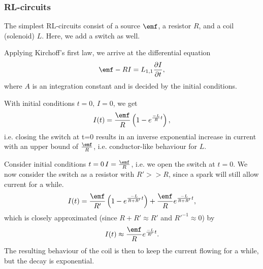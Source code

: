 \documentclass[a4paper, 12pt]{article}
\begin{document}
        \subsubsection{RL-circuits}
            The simplest RL-circuits consist of a source $\emf$, a resistor $R$, and a coil (solenoid) $L$.
            Here, we add a switch as well.

            Applying Kirchoff's first law, we arrive at the differential equation
            \begin{equation}
                \emf - RI = L_{1,1}\frac{\partial I}{\partial t},
            \end{equation}
            where $A$ is an integration constant and is decided by the initial conditions.

            With initial conditions $t=0,\, I=0$, we get 
            \begin{equation}
                I(t) = \frac{\emf}{R}\left(1-e^{\frac{-L}{R}t}\right),
            \end{equation}
            i.e. closing the switch at t=0 results in an inverse exponential increase in current 
            with an upper bound of $\frac{\emf}{R}$, i.e. conductor-like behaviour for $L$.

            Consider initial conditions $t=0\, I = \frac{\emf}{R}$, i.e. we open the switch at $t=0$.
            We now consider the switch as a resistor with $R' >> R$, since a spark will still allow current for a while.
            \begin{equation}
                I(t) = \frac{\emf}{R'}\left(1-e^{\frac{-L}{R+R'}t}\right) + \frac{\emf}{R} e^{\frac{-L}{R+R'}t},
            \end{equation}
            which is closely approximated (since $R+R' \approx R'$ and $R'^{-1} \approx 0$) by
            \begin{equation}
                I(t) \approx \frac{\emf}{R}e^{\frac{-L}{R'}t}.
            \end{equation}
            The resulting behaviour of the coil is then to keep the current flowing for a while, but the decay is exponential.
            
\end{document}
